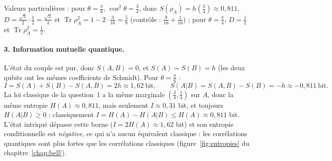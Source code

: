 \begin{correction}
\begin{center}
\begin{minipage}{\linewidth}\centering
{}
\label{fig:ex-entropie}
\end{minipage}
\end{center}

Valeurs particulières : pour $\theta=\frac\pi6$, $\cos^2\theta=\frac34$, donc $S(\rho_A)=h(\frac34)\approx0{,}811$,
$D=\frac{\sqrt3}{2}\cdot\frac12=\frac{\sqrt3}{4}$ et
$\operatorname{Tr}\rho_A^2=1-2\cdot\frac{3}{16}=\frac58$ (contrôle : $\frac9{16}+\frac1{16}$) ; pour $\theta=\frac\pi4$,
$D=\frac12$ et $\operatorname{Tr}\rho_A^2=\frac12$.

\paragraph{3. Information mutuelle quantique.} L'état du couple est pur, donc $S(A,B)=0$, et
$S(A)=S(B)=h$ (les deux qubits ont les mêmes coefficients de Schmidt). Pour $\theta=\frac\pi6$ :
\[
  I=S(A)+S(B)-S(A,B)=2h\approx1{,}62\ \text{bit},\qquad
  S(A|B)=S(A,B)-S(B)=-h\approx-0{,}811\ \text{bit}.
\]
La loi classique de la question~1 a la même marginale $(\frac34,\frac14)$ sur $A$, donc la même
entropie $H(A)\approx0{,}811$, mais seulement $I\approx0{,}31$ bit, et toujours $H(A|B)\ge0$ :
classiquement $I=H(A)-H(A|B)\le H(A)\approx0{,}811$ bit. L'état intriqué dépasse cette borne
($I=2H(A)\approx1{,}62$ bit) et son entropie conditionnelle est \emph{négative}, ce qui n'a aucun
équivalent classique : les corrélations quantiques sont plus fortes que les corrélations classiques
(figure~\ref{fig:entropies} du chapitre~\ref{chap:bell}).
\end{correction}

